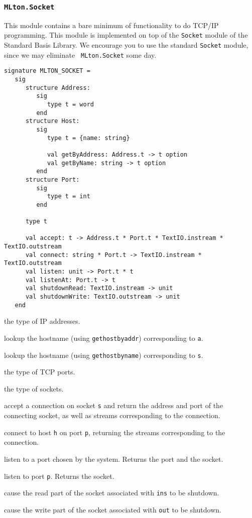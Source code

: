 \subsubsection{{\tt MLton.Socket}}

This module contains a bare minimum of functionality to do TCP/IP
programming.  This module is implemented on top of the {\tt Socket}
module of the Standard Basis Library.  We encourage you to use the
standard {\tt Socket} module, since we may eliminate {\tt
MLton.Socket} some day.
\begin{verbatim}
signature MLTON_SOCKET =
   sig
      structure Address:
         sig
            type t = word
         end
      structure Host:
         sig
            type t = {name: string}

            val getByAddress: Address.t -> t option
            val getByName: string -> t option
         end
      structure Port:
         sig
            type t = int
         end

      type t

      val accept: t -> Address.t * Port.t * TextIO.instream * TextIO.outstream
      val connect: string * Port.t -> TextIO.instream * TextIO.outstream
      val listen: unit -> Port.t * t
      val listenAt: Port.t -> t
      val shutdownRead: TextIO.instream -> unit
      val shutdownWrite: TextIO.outstream -> unit
   end
\end{verbatim}

\begin{description}

the type of IP addresses.

lookup the hostname (using {\tt gethostbyaddr}) corresponding to {\tt a}.

lookup the hostname (using {\tt gethostbyname}) corresponding to {\tt s}.

the type of TCP ports.

the type of sockets.

accept a connection on socket {\tt s} and return the address and
port of the connecting socket, as well as streams corresponding to the
connection.

connect to host {\tt h} on port {\tt p}, returning the streams
corresponding to the connection.

listen to a port chosen by the system.  Returns the port and the socket.

listen to port {\tt p}.  Returns the socket.

cause the read part of the socket associated with {\tt ins} to be shutdown.

cause the write part of the socket associated with {\tt out} to be shutdown.
\end{description}
%
